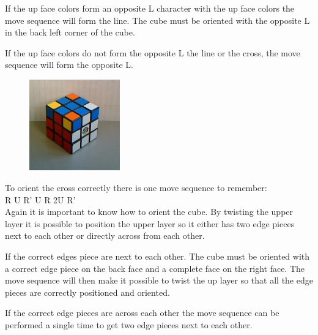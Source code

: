 If the up face colors form an opposite L character with the up face colors the move sequence will form the line. The cube must be oriented with the opposite L in the back left corner of the cube. 

If the up face colors do not form the opposite L the line or the cross, the move sequence will form the opposite L.

\begin{figure}
\begin{center}
	\includegraphics[width=0.35\textwidth]{input/pics/7LLedges.jpg}	
\end{center}
\caption{}
\label{fig:7LLedges}
\end{figure}


To orient the cross correctly there is one move sequence to remember: \\

R U R' U R 2U R' \\

Again it is important to know how to orient the cube. By twisting the upper layer it is possible to position the upper layer so it either has two edge pieces next to each other or directly across from each other.

If the correct edges piece are next to each other. The cube must be oriented with a correct edge piece on the back face and a complete face on the right face. The move sequence will then make it possible to twist the up layer so that all the edge pieces are correctly positioned and oriented.

If the correct edge pieces are across each other the move sequence can be performed a single time to get two edge pieces next to each other.


